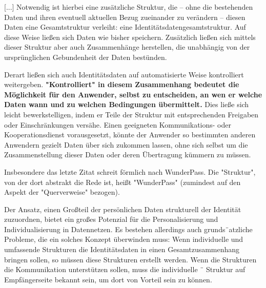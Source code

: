 \vspace{0.3cm}


\begin{Zitat}

[...] Notwendig ist hierbei eine zusätzliche Struktur, die – ohne die bestehenden Daten und ihren eventuell aktuellen Bezug zueinander zu verändern – diesen Daten eine Gesamtstruktur verleiht: eine Identitätsdatengesamtstruktur. Auf diese Weise ließen sich Daten wie bisher speichern. Zusätzlich ließen sich mittels dieser Struktur aber auch Zusammenhänge herstellen, die unabhängig von der ursprünglichen Gebundenheit der Daten bestünden.

Derart ließen sich auch Identitätsdaten auf automatisierte Weise kontrolliert weitergeben. \textbf{"Kontrolliert" in diesem Zusammenhang bedeutet die Möglichkeit für den Anwender, selbst zu entscheiden, an wen er welche Daten wann und zu welchen Bedingungen übermittelt.} Dies ließe sich leicht bewerkstelligen, indem er Teile der Struktur mit entsprechenden Freigaben oder Einschränkungen versähe. Einen geeigneten Kommunikations- oder Kooperationsdienst vorausgesetzt, könnte der Anwender so bestimmten anderen Anwendern gezielt Daten über sich zukommen lassen, ohne sich selbst um die Zusammenstellung dieser Daten oder deren Übertragung kümmern zu müssen.

\end{Zitat}

\vspace{0.3cm}


\begin{Fazit}

Insbesondere das letzte Zitat schreit förmlich nach WunderPass. Die "Struktur", von der dort abstrakt die Rede ist, heißt "WunderPass" (zumindest auf den Aspekt der "Querverweise" bezogen).

\end{Fazit}

\vspace{0.3cm}


\begin{Zitat}[Herausforderung]

Der Ansatz, einen Großteil der persönlichen Daten strukturell der Identität zuzuordnen,
bietet ein großes Potenzial für die Personalisierung und Individualisierung in Datennetzen. Es bestehen allerdings auch grunds¨atzliche Probleme, die ein solches Konzept überwinden muss: Wenn individuelle und umfassende Strukturen die Identitätsdaten in einen Gesamtzusammenhang bringen sollen, so müssen diese Strukturen erstellt werden. Wenn die Strukturen die Kommunikation unterstützen sollen, muss die individuelle ¨
Struktur auf Empfängerseite bekannt sein, um dort von Vorteil sein zu können.

\end{Zitat}

